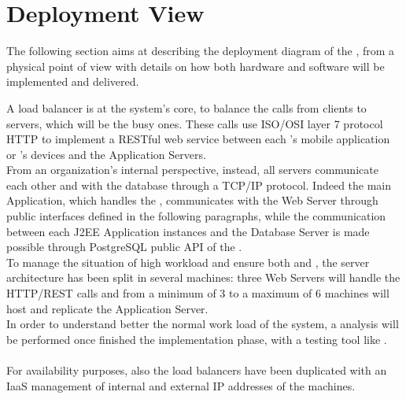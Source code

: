 \documentclass[../../DD.tex]{subfiles}
\begin{document}
\section{Deployment View\label{sect:2.3}}

The following section aims at describing the deployment diagram of the , from a physical point of view with details on how both hardware and software will be implemented and delivered.


A load balancer is at the system's core, to balance the calls from clients to servers, which will be the busy ones. These calls use ISO/OSI layer 7 protocol HTTP to implement a RESTful web service between each 's mobile application or 's devices and the Application Servers. \\ 

From an organization's internal perspective, instead, all servers communicate each other and with the database through a TCP/IP protocol. Indeed the main Application, which handles the , communicates with the Web Server through public interfaces defined in the following paragraphs, while the communication between each J2EE Application instances and the Database Server is made possible through PostgreSQL public API of the . \\

To manage the situation of high workload and ensure both  and , the server architecture has been split in several machines: three Web Servers will handle the HTTP/REST calls and from a minimum of 3 to a maximum of 6 machines will host and replicate the Application Server. \\
In order to understand better the normal work load of the system, a  analysis will be performed once finished the implementation phase, with a testing tool like . \\\\
For availability purposes, also the load balancers have been duplicated with an IaaS management of internal and external IP addresses of the machines. \\\\

\newpage
\end{document}

